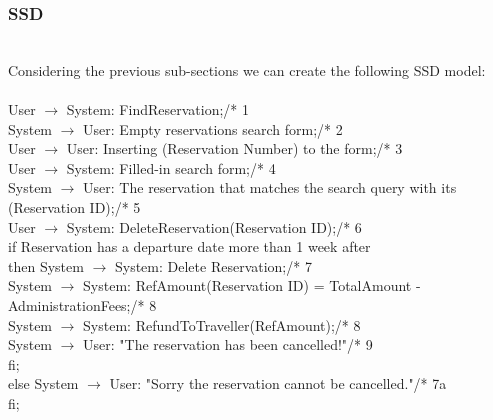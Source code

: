 \subsubsection{SSD}
\creator{\studentC}
\updater{\studentA}
\secondUpdater{\studentB}\\
Considering the previous sub-sections we can create the following SSD model:\\\\
User $\rightarrow$ System: FindReservation;\hfill /* 1\\
System $\rightarrow$ User: Empty reservations search form;\hfill /* 2\\
User $\rightarrow$ User: Inserting (Reservation Number) to the form;\hfill /* 3\\
User $\rightarrow$ System: Filled-in search form;\hfill /* 4\\
System $\rightarrow$ User: The reservation that matches the search query with its (Reservation ID);\hfill /* 5\\
User $\rightarrow$ System: DeleteReservation(Reservation ID);\hfill /* 6\\
if Reservation has a departure date more than 1 week after\\
then System $\rightarrow$ System: Delete Reservation;\hfill /* 7\\
\phantom{x}\hspace{2ex}System $\rightarrow$ System: RefAmount(Reservation ID) = TotalAmount - AdministrationFees;\hfill /* 8\\
\phantom{x}\hspace{2ex}System $\rightarrow$ System: RefundToTraveller(RefAmount);\hfill /* 8\\
\phantom{x}\hspace{2ex}System $\rightarrow$ User: "The reservation has been cancelled!"\hfill /* 9\\
\phantom{x}\hspace{2ex}fi;\\
else System $\rightarrow$ User: "Sorry the reservation cannot be cancelled."\hfill /* 7a\\
fi;\\
\newpage
